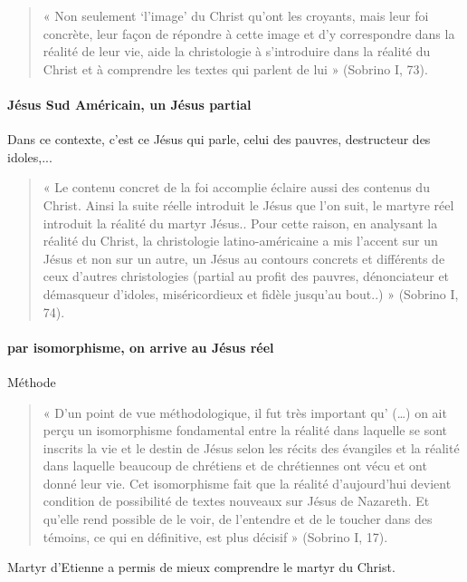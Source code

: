 \begin{quote}    
« Non seulement ‘l’image’ du Christ qu’ont les croyants, mais leur foi concrète, leur façon de
répondre à cette image et d’y correspondre dans la réalité de leur vie, aide la christologie à s’introduire
dans la réalité du Christ et à comprendre les textes qui parlent de lui » (Sobrino I, 73).
    
\end{quote}

\paragraph{Jésus Sud Américain, un Jésus partial} Dans ce contexte, c'est ce Jésus qui parle, celui des pauvres, destructeur des idoles,...
\begin{quote}
« Le contenu concret de la foi accomplie éclaire aussi des contenus du Christ. Ainsi la suite réelle
introduit le Jésus que l’on suit, le martyre réel introduit la réalité du martyr Jésus.. Pour cette raison,
en analysant la réalité du Christ, la christologie latino-américaine a mis l’accent sur un Jésus et non sur
un autre, un Jésus au contours concrets et différents de ceux d’autres christologies (partial au profit des
pauvres, dénonciateur et démasqueur d’idoles, miséricordieux et fidèle jusqu’au bout..) » (Sobrino I,
74).
\end{quote}


\paragraph{par isomorphisme, on arrive au Jésus réel} Méthode
\begin{quote}
    « D’un point de vue méthodologique, il fut très important qu’ (…) on ait perçu un isomorphisme
fondamental entre la réalité dans laquelle se sont inscrits la vie et le destin de Jésus selon les récits des
évangiles et la réalité dans laquelle beaucoup de chrétiens et de chrétiennes ont vécu et ont donné leur
vie. Cet isomorphisme fait que la réalité d’aujourd’hui devient condition de possibilité de textes
nouveaux sur Jésus de Nazareth. Et qu’elle rend possible de le voir, de l’entendre et de le toucher dans
des témoins, ce qui en définitive, est plus décisif » (Sobrino I, 17).
\end{quote}

\begin{Ex}
    Martyr d'Etienne a permis de mieux comprendre le martyr du Christ. 
\end{Ex}
